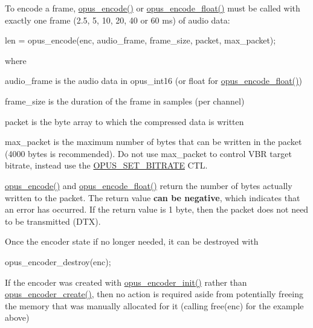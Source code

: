 To encode a frame, \hyperlink{group__opus__encoder_gad2d6bf6a9ffb6674879d7605ed073e25}{opus\_\-encode()} or \hyperlink{group__opus__encoder_ga4ae9905859cd241ef4bb5c59cd5e5309}{opus\_\-encode\_\-float()} must be called with exactly one frame (2.5, 5, 10, 20, 40 or 60 ms) of audio data: 
\begin{DoxyCode}
 len = opus_encode(enc, audio_frame, frame_size, packet, max_packet);
\end{DoxyCode}


where 
\begin{DoxyItemize}
\item audio\_\-frame is the audio data in opus\_\-int16 (or float for \hyperlink{group__opus__encoder_ga4ae9905859cd241ef4bb5c59cd5e5309}{opus\_\-encode\_\-float()}) 
\item frame\_\-size is the duration of the frame in samples (per channel) 
\item packet is the byte array to which the compressed data is written 
\item max\_\-packet is the maximum number of bytes that can be written in the packet (4000 bytes is recommended). Do not use max\_\-packet to control VBR target bitrate, instead use the \hyperlink{group__opus__encoderctls_ga0bb51947e355b33d0cb358463b5101a7}{OPUS\_\-SET\_\-BITRATE} CTL. 
\end{DoxyItemize}

\hyperlink{group__opus__encoder_gad2d6bf6a9ffb6674879d7605ed073e25}{opus\_\-encode()} and \hyperlink{group__opus__encoder_ga4ae9905859cd241ef4bb5c59cd5e5309}{opus\_\-encode\_\-float()} return the number of bytes actually written to the packet. The return value {\bfseries can be negative}, which indicates that an error has occurred. If the return value is 1 byte, then the packet does not need to be transmitted (DTX).

Once the encoder state if no longer needed, it can be destroyed with


\begin{DoxyCode}
 opus_encoder_destroy(enc);
\end{DoxyCode}


If the encoder was created with \hyperlink{group__opus__encoder_ga515db1c267a7421dacaad3610f79eb79}{opus\_\-encoder\_\-init()} rather than \hyperlink{group__opus__encoder_gaa89264fd93c9da70362a0c9b96b9ca88}{opus\_\-encoder\_\-create()}, then no action is required aside from potentially freeing the memory that was manually allocated for it (calling free(enc) for the example above) 

